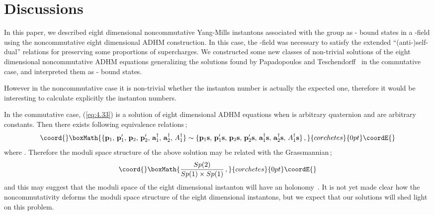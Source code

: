 \documentclass[a4paper,12pt]{article}
\begin{document}
\section{Discussions}

In this paper, 
we described eight dimensional noncommutative 
Yang-Mills instantons associated with the group \coordHE{} 
as \coordHE{}-\coordHE{} bound states in a \coordHE{}-field
using the noncommutative eight dimensional ADHM construction. 
In this case, the \coordHE{}-field was necessary to satisfy the extended 
``(anti-)self-dual'' relations for preserving some proportions of supercharges.
We constructed some new classes of non-trivial solutions 
of the eight dimensional noncommutative ADHM equations 
generalizing the solutions found by Papadopoulos and Teschendorff~\cite{pt} 
in the commutative case, 
and interpreted them as \coordHE{}-\coordHE{} bound states.

However in the noncommutative case 
it is non-trivial whether the instanton number 
is actually the expected one, therefore it would be interesting to calculate  
explicitly the instanton numbers.

In the commutative case, (\ref{eq:4.33}) is a solution of eight dimensional 
ADHM equations when \coordHE{} is 
arbitrary quaternion and \coordHE{} 
are arbitrary constants. Then there exists following equivalence relations\,;
\[\coord{}\boxMath{  \{ \mathbf{p}_{1},\,\mathbf{p}_1^{\prime},\,\mathbf{p}_{2},\,
\mathbf{p}_2^{\prime},\,\mathbf{a}_1^{\dagger},\,\mathbf{a}_2^{\dagger} ,\,
A_1^{\dagger}\}
\sim  \{ \mathbf{p}_{1}\mathbf{s},\,\mathbf{p}_1^{\prime}\mathbf{s},\,
\mathbf{p}_{2}\mathbf{s},\,
\mathbf{p}_2^{\prime}\mathbf{s},\,\mathbf{a}_1^{\dagger}\mathbf{s},\,
\mathbf{a}_2^{\dagger}\mathbf{s},\,A_1^{\dagger}\mathbf{s} \}\,,}{corchetes}{0pt}\coordE{}\]
where \coordHE{}. 
Therefore the moduli space structure of the above solution  
may be related with the Grassmannian\,;
\[\coord{}\boxMath{  \frac{Sp(2)}{Sp(1)\times Sp(1)} \,, }{corchetes}{0pt}\coordE{}\] 
and this may suggest that the moduli space of the eight dimensional 
instanton will have an \coordHE{} holonomy~\cite{ohta}. 
It is not yet made clear 
how the noncommutativity deforms the moduli space structure of 
the eight dimensional instantons, but 
we expect that our solutions will shed light on this problem. 
\end{document}
